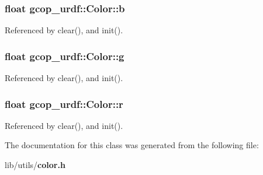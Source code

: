 \subsubsection[{b}]{\setlength{\rightskip}{0pt plus 5cm}float {\bf gcop\-\_\-urdf\-::\-Color\-::b}}\label{classgcop__urdf_1_1Color_a7d9fb909c6f46d6ac0d16b2e991cb3a2}


\-Referenced by clear(), and init().

\subsubsection[{g}]{\setlength{\rightskip}{0pt plus 5cm}float {\bf gcop\-\_\-urdf\-::\-Color\-::g}}\label{classgcop__urdf_1_1Color_aab6d2e93cf182d0f7fd7920f627a4c3a}


\-Referenced by clear(), and init().

\subsubsection[{r}]{\setlength{\rightskip}{0pt plus 5cm}float {\bf gcop\-\_\-urdf\-::\-Color\-::r}}\label{classgcop__urdf_1_1Color_a7a330ad50cf50b09414a69ca9247e05d}


\-Referenced by clear(), and init().



\-The documentation for this class was generated from the following file\-:\begin{DoxyCompactItemize}
\item 
lib/utils/{\bf color.\-h}\end{DoxyCompactItemize}
